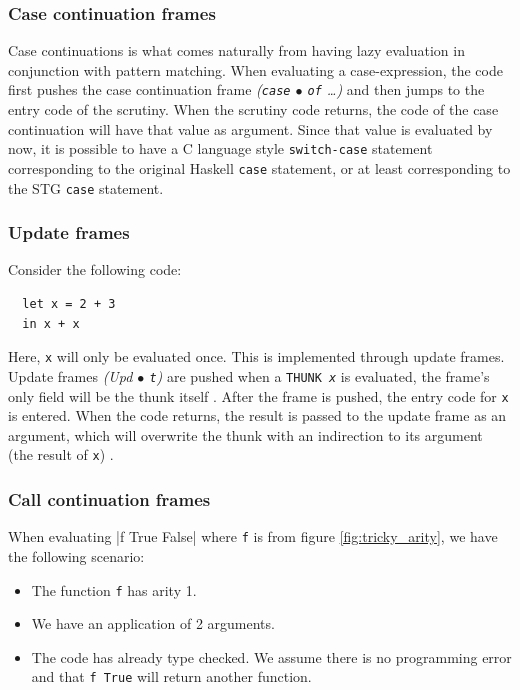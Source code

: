 \subsubsection{Case continuation frames}

Case continuations is what comes naturally from having lazy evaluation
in conjunction with pattern matching. When evaluating a case-expression, the code first
pushes the case continuation frame \emph{(\texttt{case} $\bullet$ \texttt{of}
\dots)} and then jumps to the entry code of the scrutiny. When the
scrutiny code returns, the code of the case continuation will have
that value as argument. Since that value is evaluated by now, it is
possible to have a C language style \texttt{switch-case} statement
corresponding to the original Haskell \texttt{case} statement,
or at least corresponding to the STG \texttt{case} statement.

\subsubsection{Update frames}

Consider the following code:

\begin{verbatim}
  let x = 2 + 3
  in x + x
\end{verbatim}

Here, \texttt{x} will only be evaluated once. This is implemented
through update frames. Update frames \emph{(Upd $\bullet$ \texttt{t})}
are pushed when a \texttt{THUNK \emph{x}} is evaluated, the frame's only
field will be the thunk itself \cite{github_thunk_code}. After the frame is
pushed, the entry code for \texttt{x} is entered. When the code returns,
the result is passed to the update frame as an argument, which will
overwrite the thunk with an indirection to its argument (the result of
\texttt{x}) \cite{github_updates_indirection}.


\subsubsection{Call continuation frames}

When evaluating |f True False|
where \texttt{f} is from figure \ref{fig:tricky_arity}, we have the
following scenario:

\begin{itemize}
  \item
    The function \texttt{f} has arity 1.
  \item
    We have an application of 2 arguments.
  \item
    The code has already type checked. We assume there is no
programming error and that \texttt{f True} will return another function.
\end{itemize}

